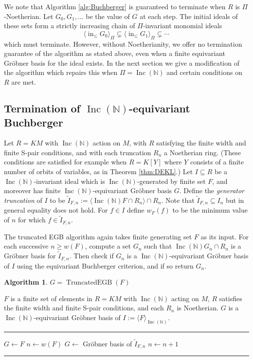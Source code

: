 \documentclass{amsart}
\theoremstyle{definition}
\newtheorem{algorithm}[theorem]{Algorithm}
\theoremstyle{remark}
\numberwithin{equation}{section}
\newcommand{\B}[1]{\mathbb #1}
\newcommand{\alg}[1]{\operatorname{#1}}
\newcommand{\ideal}[1]{\langle #1 \rangle}
\DeclareMathOperator{\initial}{in}
\newcommand{\Inc}{\operatorname{Inc}(\B N)}
\newcommand{\mon}{M}
\newcommand{\LT}{\initial_{\leq}}
\begin{document}
We note that Algorithm \ref{alg:Buchberger} is guaranteed to terminate when $R$ is $\Pi$-Noetherian.  Let $G_0,G_1,\ldots$ be the value of $G$ at each step.  The initial ideals of these sets form a strictly increasing chain of $\Pi$-invariant monomial ideals
 \[ \ideal{\LT G_0}_\Pi \subsetneq \ideal{\LT G_1}_\Pi \subsetneq \cdots \]
which must terminate.  However, without Noetherianity, we offer no termination guarantee of the algorithm as stated above, even when a finite equivariant Gr\"obner basis for the ideal exists.  In the next section we give a modification of the algorithm which repairs this when $\Pi = \Inc$ and certain conditions on $R$ are met.

\subsection{Termination of $\Inc$-equivariant Buchberger}
Let $R = K\mon$ with $\Inc$ action on $\mon$, with $R$ satisfying the finite width and finite S-pair conditions, and with each truncation $R_n$ a Noetherian ring.  (These conditions are satisfied for example when $R = K[Y]$ where $Y$ consists of a finite number of orbits of variables, as in Theorem \ref{thm:DEKL}.)   Let $I \subseteq R$ be a $\Inc$-invariant ideal which is $\Inc$-generated by finite set $F$, and moreover has finite $\Inc$-equivariant Gr\"obner basis $G$.  Define the {\em generator truncation} of $I$ to be $\tilde{I}_{F,n} := \ideal{\Inc F \cap R_n} \cap R_n$.  Note that $\tilde{I}_{F,n} \subseteq I_n$ but in general equality does not hold.  For $f \in I$ define $w_F(f)$ to be the minimum value of $n$ for which $f \in \tilde{I}_{F,n}$.

The truncated EGB algorithm again takes finite generating set $F$ as its input.  For each successive $n \geq w(F)$, compute a set $G_n$ such that $\Inc G_n \cap R_n$ is a Gr\"obner basis for $\tilde{I}_{F,n}$.  Then check if $G_n$ is a $\Inc$-equivariant Gr\"obner basis of $I$ using the equivariant Buchberger criterion, and if so return $G_n$.

\begin{algorithm}\label{alg:truncBuch}
$G = \alg{TruncatedEGB}(F)$
\begin{algorithmic}[1]
\REQUIRE $F$ is a finite set of elements in $R = K\mon$ with $\Inc$ acting on $\mon$, $R$ satisfies the finite width and finite S-pair conditions, and each $R_n$ is Noetherian.
\ENSURE $G$ is a $\Inc$-equivariant Gr\"obner basis of $I := \ideal{F}_{\Inc}$.

\smallskip \hrule \smallskip

\STATE $G\gets F$
\STATE $n\gets w(F)$
\WHILE{$G$ not a $\Inc$-equivariant Gr\"obner basis of $I$}
	\STATE $G\gets$ Gr\"obner basis of $\tilde{I}_{F,n}$
	\STATE $n \gets n+1$
\ENDWHILE
\smallskip \hrule \smallskip
\end{algorithmic}
\end{algorithm}
\end{document}
